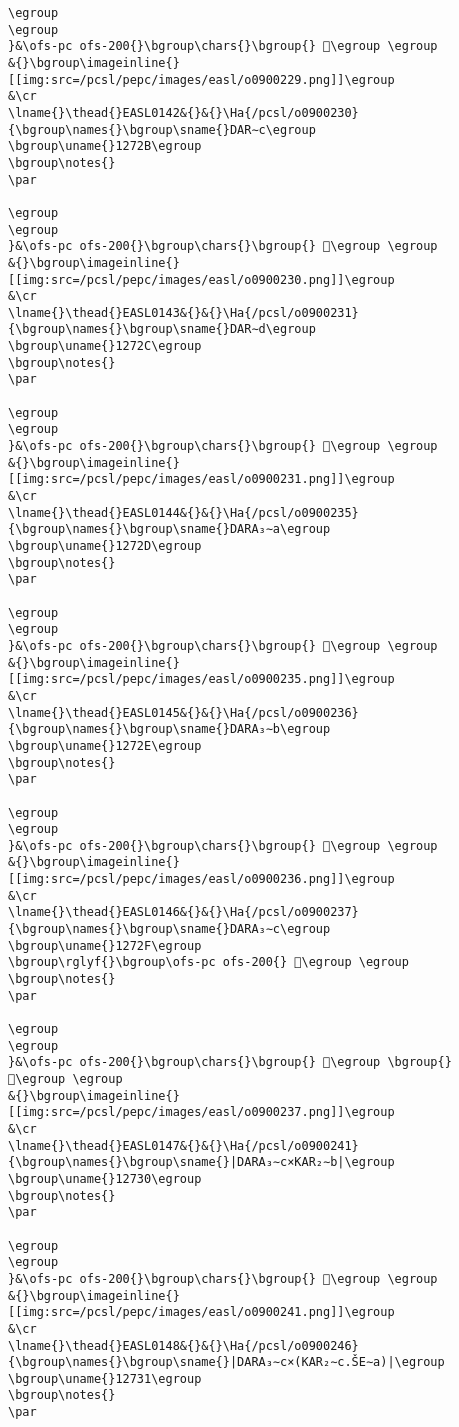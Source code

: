 \begin{verbatim}
\egroup
\egroup
}&\ofs-pc ofs-200{}\bgroup\chars{}\bgroup{} 𒜪\egroup \egroup
&{}\bgroup\imageinline{}[[img:src=/pcsl/pepc/images/easl/o0900229.png]]\egroup
&\cr
\lname{}\thead{}EASL0142&{}&{}\Ha{/pcsl/o0900230}{\bgroup\names{}\bgroup\sname{}DAR∼c\egroup
\bgroup\uname{}1272B\egroup
\bgroup\notes{}
\par 

\egroup
\egroup
}&\ofs-pc ofs-200{}\bgroup\chars{}\bgroup{} 𒜫\egroup \egroup
&{}\bgroup\imageinline{}[[img:src=/pcsl/pepc/images/easl/o0900230.png]]\egroup
&\cr
\lname{}\thead{}EASL0143&{}&{}\Ha{/pcsl/o0900231}{\bgroup\names{}\bgroup\sname{}DAR∼d\egroup
\bgroup\uname{}1272C\egroup
\bgroup\notes{}
\par 

\egroup
\egroup
}&\ofs-pc ofs-200{}\bgroup\chars{}\bgroup{} 𒜬\egroup \egroup
&{}\bgroup\imageinline{}[[img:src=/pcsl/pepc/images/easl/o0900231.png]]\egroup
&\cr
\lname{}\thead{}EASL0144&{}&{}\Ha{/pcsl/o0900235}{\bgroup\names{}\bgroup\sname{}DARA₃∼a\egroup
\bgroup\uname{}1272D\egroup
\bgroup\notes{}
\par 

\egroup
\egroup
}&\ofs-pc ofs-200{}\bgroup\chars{}\bgroup{} 𒜭\egroup \egroup
&{}\bgroup\imageinline{}[[img:src=/pcsl/pepc/images/easl/o0900235.png]]\egroup
&\cr
\lname{}\thead{}EASL0145&{}&{}\Ha{/pcsl/o0900236}{\bgroup\names{}\bgroup\sname{}DARA₃∼b\egroup
\bgroup\uname{}1272E\egroup
\bgroup\notes{}
\par 

\egroup
\egroup
}&\ofs-pc ofs-200{}\bgroup\chars{}\bgroup{} 𒜮\egroup \egroup
&{}\bgroup\imageinline{}[[img:src=/pcsl/pepc/images/easl/o0900236.png]]\egroup
&\cr
\lname{}\thead{}EASL0146&{}&{}\Ha{/pcsl/o0900237}{\bgroup\names{}\bgroup\sname{}DARA₃∼c\egroup
\bgroup\uname{}1272F\egroup
\bgroup\rglyf{}\bgroup\ofs-pc ofs-200{} 𒜯\egroup \egroup
\bgroup\notes{}
\par 

\egroup
\egroup
}&\ofs-pc ofs-200{}\bgroup\chars{}\bgroup{} 𒜯\egroup \bgroup{} 𒜲\egroup \egroup
&{}\bgroup\imageinline{}[[img:src=/pcsl/pepc/images/easl/o0900237.png]]\egroup
&\cr
\lname{}\thead{}EASL0147&{}&{}\Ha{/pcsl/o0900241}{\bgroup\names{}\bgroup\sname{}|DARA₃∼c×KAR₂∼b|\egroup
\bgroup\uname{}12730\egroup
\bgroup\notes{}
\par 

\egroup
\egroup
}&\ofs-pc ofs-200{}\bgroup\chars{}\bgroup{} 𒜰\egroup \egroup
&{}\bgroup\imageinline{}[[img:src=/pcsl/pepc/images/easl/o0900241.png]]\egroup
&\cr
\lname{}\thead{}EASL0148&{}&{}\Ha{/pcsl/o0900246}{\bgroup\names{}\bgroup\sname{}|DARA₃∼c×(KAR₂∼c.ŠE∼a)|\egroup
\bgroup\uname{}12731\egroup
\bgroup\notes{}
\par 


\end{verbatim}
